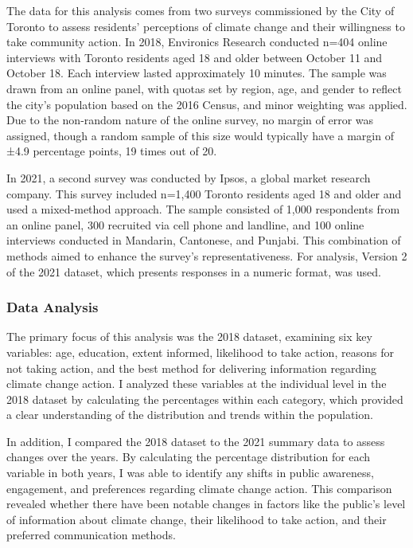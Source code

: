 \documentclass[
  letterpaper,
  DIV=11,
  numbers=noendperiod]{scrartcl}
\begin{document}
The data for this analysis comes from two surveys commissioned by the
City of Toronto to assess residents' perceptions of climate change and
their willingness to take community action. In 2018, Environics Research
conducted n=404 online interviews with Toronto residents aged 18 and
older between October 11 and October 18. Each interview lasted
approximately 10 minutes. The sample was drawn from an online panel,
with quotas set by region, age, and gender to reflect the city's
population based on the 2016 Census, and minor weighting was applied.
Due to the non-random nature of the online survey, no margin of error
was assigned, though a random sample of this size would typically have a
margin of ±4.9 percentage points, 19 times out of 20.

In 2021, a second survey was conducted by Ipsos, a global market
research company. This survey included n=1,400 Toronto residents aged 18
and older and used a mixed-method approach. The sample consisted of
1,000 respondents from an online panel, 300 recruited via cell phone and
landline, and 100 online interviews conducted in Mandarin, Cantonese,
and Punjabi. This combination of methods aimed to enhance the survey's
representativeness. For analysis, Version 2 of the 2021 dataset, which
presents responses in a numeric format, was used.

\subsubsection{Data Analysis}\label{data-analysis}

The primary focus of this analysis was the 2018 dataset, examining six
key variables: age, education, extent informed, likelihood to take
action, reasons for not taking action, and the best method for
delivering information regarding climate change action. I analyzed these
variables at the individual level in the 2018 dataset by calculating the
percentages within each category, which provided a clear understanding
of the distribution and trends within the population.

In addition, I compared the 2018 dataset to the 2021 summary data to
assess changes over the years. By calculating the percentage
distribution for each variable in both years, I was able to identify any
shifts in public awareness, engagement, and preferences regarding
climate change action. This comparison revealed whether there have been
notable changes in factors like the public's level of information about
climate change, their likelihood to take action, and their preferred
communication methods.
\end{document}
